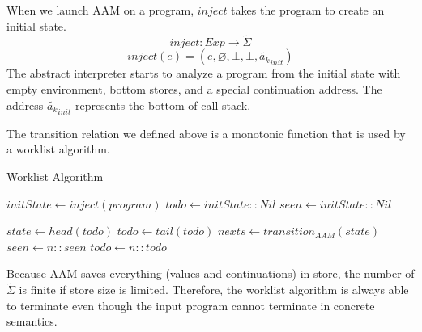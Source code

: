 \documentclass[12pt]{report}
\begin{document}
When we launch AAM on a program, $inject$ takes the program to create an initial state.
\[
inject : Exp \to \tilde{\Sigma}
\]
\[
inject(e) = (e, \varnothing, \bot, \bot, \tilde{a_k}_{init})
\]
The abstract interpreter starts to analyze a program from the initial state with empty environment, bottom stores, and a special continuation address.
The address $\tilde{a_k}_{init}$ represents the bottom of call stack.

The transition relation we defined above is a monotonic function that is used by a worklist algorithm.
\begin{algorithm}
\caption{Worklist Algorithm}
\begin{algorithmic}
\State $\textit{initState} \gets inject(program)$
\State $\textit{todo} \gets \textit{initState} :: Nil$
\State $\textit{seen} \gets \textit{initState} :: Nil$

  \State $\textit{state} \gets head(\textit{todo})$
  \State $\textit{todo} \gets tail(\textit{todo})$
  \State $\textit{nexts} \gets transition_{AAM}(\textit{state})$
      \State $\textit{seen} \gets \textit{n} :: \textit{seen}$
      \State $\textit{todo} \gets \textit{n} :: \textit{todo}$
    \EndIf
  \EndFor
\EndWhile
\end{algorithmic}
\end{algorithm}
Because AAM saves everything (values and continuations) in store, the number of $\tilde{\Sigma}$ is finite if store size is limited.
Therefore, the worklist algorithm is always able to terminate even though the input program cannot terminate in concrete semantics.
\end{document}
